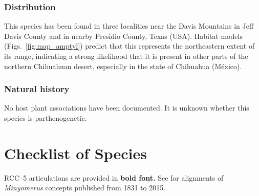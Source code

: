 \documentclass[fleqn,10pt,lineno]{wlpeerj} %
\begin{document}
		\subsubsection*{Distribution}
			This species has been found in three localities near the Davis Mountains in Jeff Davis County and in nearby Presidio County, Texas (USA).
			Habitat models (Figs.~\ref{fig:map_amptyl}) predict that this represents the northeastern extent of its range, indicating a strong likelihood that it is present in other parts of the northern Chihuahuan desert, especially in the state of Chihuahua (M\'{e}xico).
		\subsubsection*{Natural history}
			No host plant associations have been documented.
			It is unknown whether this species is parthenogenetic.
			
\newpage

\section*{Checklist of Species}\label{sec:checklist}
	RCC--5 articulations are provided in \textbf{bold font.} See \citet{jansen2015} for alignments of \textit{Minyomerus} concepts published from 1831 to 2015. 
	
\end{document}
